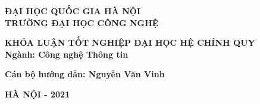 \documentclass[../../../thesis]{subfiles}
\begin{document}
\begin{titlepage}

    \begin{center}
        \textbf{
            ĐẠI HỌC QUỐC GIA HÀ NỘI\\
            TRƯỜNG ĐẠI HỌC CÔNG NGHỆ
        }

        \vspace{60pt}

        

        \vspace{20pt}

        \makeatletter

        \textbf{\large \@author}

        \vspace{60pt}

        \textbf{\LARGE \@title}

        \makeatother

        \vspace{60pt}

        \textbf{\large
            KHÓA LUẬN TỐT NGHIỆP ĐẠI HỌC HỆ CHÍNH QUY\\
            Ngành: Công nghệ Thông tin
        }

        \vspace{60pt}

    \end{center}

    \textbf{\large
        Cán bộ hướng dẫn: Nguyễn Văn Vinh
    }

    \begin{center}
        \vspace*{\fill}

        \textbf{HÀ NỘI - 2021}
    \end{center}

\end{titlepage}
\end{document}
